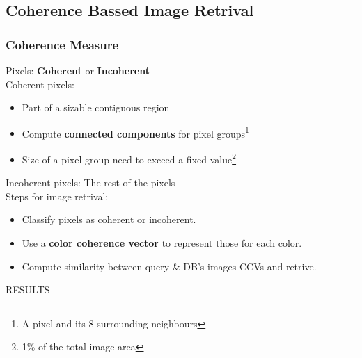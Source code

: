 \documentclass[15pt]{beamer}
\begin{document}
\subsection{Coherence Bassed Image Retrival}
\begin{frame}
\frametitle{Coherence Measure}
Pixels: \textbf{Coherent} or \textbf{Incoherent}\\[\baselineskip]
\pause
Coherent pixels:\\
\pause
\begin{itemize}[label=$\blacksquare$]
\item Part of a sizable contiguous region
\pause

\item Compute \textbf{connected components} for pixel groups\footnote{A pixel and its 8 surrounding neighbours}

\pause
\item Size of a pixel group need to exceed a fixed value\footnote{1\% of the total image area} \\[\baselineskip]
\pause
\end{itemize}
Incoherent pixels: The rest of the pixels\\[\baselineskip]
Steps for image retrival:\\[\baselineskip]
\begin{itemize}[label=$\blacksquare$]
\pause
\item Classify pixels as coherent or incoherent.\\[\baselineskip]
\pause
\item Use a \textbf{color coherence vector} to represent those for each color.\\[\baselineskip]
\pause
\item Compute similarity between query \& DB's images CCVs and retrive.
\end{itemize}

\end{frame}

\begin{frame}
\fontsize{18pt}{30}\selectfont
\centering
RESULTS
\end{frame}
\end{document}

